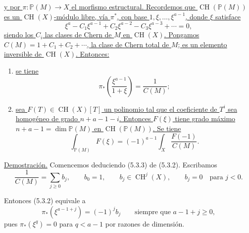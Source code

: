 \underline{y por $\pi:\mathbb P(M)\to X$ el morfismo estructural.
Recordemos que $\operatorname{CH}(\mathbb P(M))$ es un
$\operatorname{CH}(X)$-módulo libre, vía $\pi^*$, con base
$1,\xi,\ldots,\xi^{a-1}$, donde $\xi$ satisface}
{\small
\begin{equation}\tag{5.3.1}
\xi^a-C_1\xi^{a-1}+C_2\xi^{a-2}-C_3\xi^{a-3}+\cdots=0,
\end{equation}
}
\underline{siendo los $C_i$ las clases de Chern de $M$ en
$\operatorname{CH}(X)$. Pongamos
$C(M)=1+C_1+C_2+\cdots$, la clase de Chern total de $M$; es un
elemento inversible de $\operatorname{CH}(X)$. Entonces:}
\begin{enumerate}
\item[(i)] \underline{se tiene}
\begin{equation}\tag{5.3.2}
\pi_*\!\left(\frac{\xi^{a-1}}{1+\xi}\right)
=\frac{1}{C(M)};
\end{equation}
\item[(ii)] \underline{sea
$F(T)\in\operatorname{CH}(X)[T]$ un polinomio tal que el coeficiente
de $T^i$ sea homogéneo de grado $n+a-1-i$. Entonces $F(\xi)$ tiene
grado máximo $n+a-1=\dim\mathbb P(M)$ en
$\operatorname{CH}(\mathbb P(M))$. Se tiene}
\begin{equation}\tag{5.3.3}
\int_{\mathbb P(M)}F(\xi)
=(-1)^{a-1}\int_X\frac{F(-1)}{C(M)}.
\end{equation}
\end{enumerate}

\noindent\underline{Demostración.}
Comencemos deduciendo (5.3.3) de (5.3.2). Escribamos
\begin{equation}\tag{5.3.4}
\frac{1}{C(M)}=\sum_{j\geq0}b_j,\qquad
b_0=1,\qquad b_j\in\operatorname{CH}^j(X),\qquad
b_j=0\quad\text{para }j<0.
\end{equation}

\pageoriginale

Entonces (5.3.2) equivale a
\begin{equation}\tag{5.3.5}
\pi_*(\xi^{a-1+j})=(-1)^jb_j
\qquad\text{siempre que }a-1+j\geq0,
\end{equation}
pues $\pi_*(\xi^q)=0$ para $q<a-1$ por razones de dimensión.

